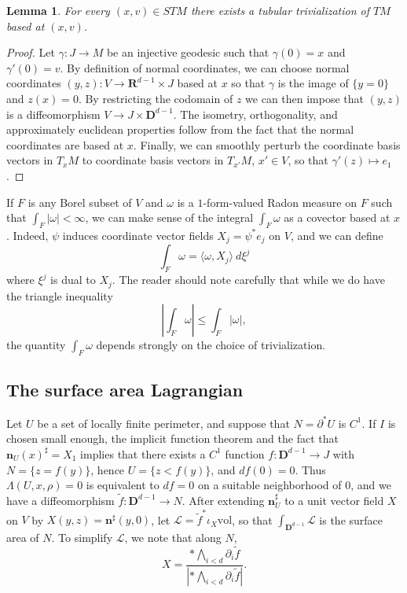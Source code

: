 \documentclass[reqno,12pt,letterpaper]{amsart}
\newcommand{\RR}{\mathbf{R}}
\newcommand{\DD}{\mathbf{D}}
\newcommand{\normal}{\mathbf n}
\newcommand{\vol}{\mathrm{vol}}
\newtheorem{lemma}[theorem]{Lemma}
\theoremstyle{definition}
\numberwithin{equation}{section}
\begin{document}
\begin{lemma}
For every $(x, v) \in STM$ there exists a tubular trivialization of $TM$ based at $(x, v)$.
\end{lemma}
\begin{proof}
Let $\gamma: J \to M$ be an injective geodesic such that $\gamma(0) = x$ and $\gamma'(0) = v$.
By definition of normal coordinates, we can choose normal coordinates $(y, z): V \to \RR^{d - 1} \times J$ based at $x$ so that $\gamma$ is the image of $\{y = 0\}$ and $z(x) = 0$.
By restricting the codomain of $z$ we can then impose that $(y, z)$ is a diffeomorphism $V \to J \times \DD^{d - 1}$.
The isometry, orthogonality, and approximately euclidean properties follow from the fact that the normal coordinates are based at $x$.
Finally, we can smoothly perturb the coordinate basis vectors in $T_xM$ to coordinate basis vectors in $T_{x'}M$, $x' \in V$, so that $\gamma'(z) \mapsto e_1$.
\end{proof}

If $F$ is any Borel subset of $V$ and $\omega$ is a $1$-form-valued Radon measure on $F$ such that $\int_F |\omega| < \infty$, we can make sense of the integral $\int_F \omega$ as a covector based at $x$.
Indeed, $\psi$ induces coordinate vector fields $X_j = \psi^* e_j$ on $V$, and we can define
$$\int_F \omega = \langle \omega, X_j\rangle ~d\xi^j$$
where $\xi^j$ is dual to $X_j$.
The reader should note carefully that while we do have the triangle inequality
\begin{equation}\label{excess triangle inequality}
\left|\int_F \omega\right| \leq \int_F |\omega|,
\end{equation}
the quantity $\int_F \omega$ depends strongly on the choice of trivialization.

\subsection{The surface area Lagrangian}
Let $U$ be a set of locally finite perimeter, and suppose that $N = \partial^* U$ is $C^1$.
If $I$ is chosen small enough, the implicit function theorem and the fact that $\normal_U(x)^\sharp = X_1$ implies that there exists a $C^1$ function $f: \DD^{d - 1} \to J$ with $N = \{z = f(y)\}$, hence $U = \{z < f(y)\}$, and $df(0) = 0$.
Thus $\Lambda(U, x, \rho) = 0$ is equivalent to $df = 0$ on a suitable neighborhood of $0$, and we have a diffeomorphism $\tilde f: \DD^{d - 1} \to N$.
After extending $\normal_U^\sharp$ to a unit vector field $X$ on $V$ by $X(y, z) = \normal^\sharp(y, 0)$, let $\mathscr L = \tilde f^* \iota_X \vol$, so that $\int_{\DD^{d - 1}} \mathscr L$ is the surface area of $N$.
To simplify $\mathscr L$, we note that along $N$,
$$X = \frac{*\bigwedge_{i < d} \partial_i \tilde f}{|*\bigwedge_{i < d} \partial_i \tilde f|}.$$
\end{document}
